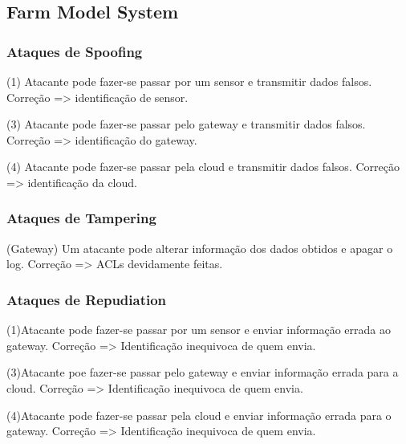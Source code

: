 \subsection{Farm Model System}


\subsubsection{Ataques de Spoofing}
\par\hfill
\par (1) Atacante pode fazer-se passar por um sensor e transmitir dados falsos.\newline
Correção => identificação de sensor.\newline

\par (3) Atacante pode fazer-se passar pelo gateway e transmitir dados falsos.\newline
Correção => identificação do gateway.\newline

\par (4) Atacante pode fazer-se passar pela cloud e transmitir dados falsos.\newline
Correção => identificação da cloud.\newline

\subsubsection{Ataques de Tampering}
\par\hfill
\par(Gateway) Um atacante pode alterar informação dos dados obtidos e apagar o log. \newline
Correção => ACLs devidamente feitas.\newline


\subsubsection{Ataques de Repudiation}
\par\hfill
\par(1)Atacante pode fazer-se passar por um sensor e enviar informação errada ao gateway.\newline
Correção => Identificação inequivoca de quem envia.\newline
\par(3)Atacante poe fazer-se passar pelo gateway e enviar informação errada para a cloud.\newline
Correção => Identificação inequivoca de quem envia.\newline
\par(4)Atacante pode fazer-se passar pela cloud e enviar informação errada para o gateway.\newline
Correção => Identificação inequivoca de quem envia.\newline


